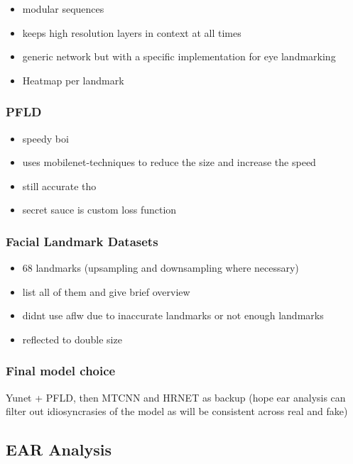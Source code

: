 \begin{itemize}
    \item modular sequences
    \item keeps high resolution layers in context at all times
    \item generic network but with a specific implementation for eye landmarking
    \item Heatmap per landmark
\end{itemize}

\subsubsection{PFLD}

\begin{itemize}
    \item speedy boi
    \item uses mobilenet-techniques to reduce the size and increase the speed
    \item still accurate tho
    \item secret sauce is custom loss function
\end{itemize}

\subsubsection{Facial Landmark Datasets}

\begin{itemize}
    \item 68 landmarks (upsampling and downsampling where necessary)
    \item list all of them and give brief overview
    \item didnt use aflw due to inaccurate landmarks or not enough landmarks
    \item reflected to double size
\end{itemize}

\subsubsection{Final model choice}

Yunet + PFLD, then MTCNN and HRNET as backup (hope ear analysis can filter out idiosyncrasies of the model as will be consistent across real and fake)

\subsection{EAR Analysis}

